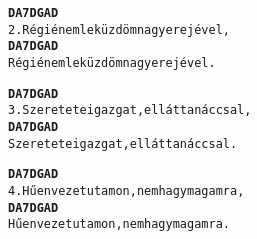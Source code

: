 \begin{minipage}{\textwidth}
\kottastart
{}
\kottaend
\begin{minipage}{\textwidth}
\begin{multicols}{2}
\begin{minipage}{\textwidth}
\begin{alltt}
\textbf{    D   A7    D        G   A     D}
2. Régi énem leküzdöm nagy erejével,
\textbf{    D   A7    D        G   A     D}
   Régi énem leküzdöm nagy erejével.
\end{alltt}
\vspace{0.0cm}
\versszakspacing
\end{minipage}
\begin{minipage}{\textwidth}
\begin{alltt}
\textbf{     D   A7  D        G      A     D}
3. Szeretete igazgat, ellát tanáccsal,
\textbf{     D   A7  D        G      A     D}
   Szeretete igazgat, ellát tanáccsal.
\end{alltt}
\vspace{0.0cm}
\versszakspacing
\end{minipage}
\begin{minipage}{\textwidth}
\begin{alltt}
\textbf{    D    A7   D        G        A    D}
4. Hűen vezet utamon, nem hagy magamra,
\textbf{    D    A7   D        G        A    D}
   Hűen vezet utamon, nem hagy magamra.
\end{alltt}
\vspace{0.0cm}
\versszakspacing
\end{minipage}
\vspace{0.2cm}
\end{multicols}
\end{minipage}

\end{minipage}
~\vspace{1.0cm}
\newline
